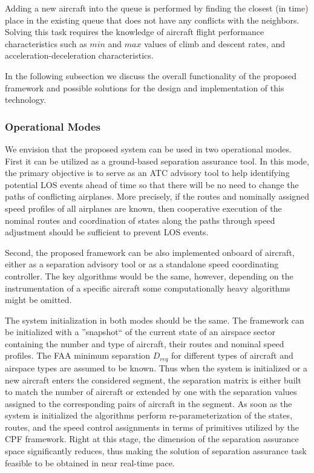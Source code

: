 \documentclass[letter,onecolumn,12pt]{aiaa-tc}
\newcommand{\1}{1_n}
\begin{document}
\begin{itemize}
Adding a new aircraft into the queue is performed by finding the closest (in time) place in the existing queue that does not have any conflicts with the neighbors. Solving this task requires the knowledge of aircraft flight performance characteristics such as $min$ and $max$ values of climb and descent rates, and acceleration-deceleration characteristics.

\end{itemize}

In the  following subsection we discuss the overall functionality of the proposed framework and possible solutions for the design and implementation of this technology.

\subsubsection{Operational Modes}

We envision that the proposed system can be used in two operational modes. First it can be utilized as a ground-based separation assurance tool. In this mode, the primary objective is to serve as an ATC advisory tool to help identifying potential LOS events ahead of time so that there will be no need to change the paths of conflicting airplanes. More precisely, if the routes and nominally assigned speed profiles of all airplanes are known, then cooperative execution of the nominal routes and coordination of states along the paths through speed adjustment should be sufficient to prevent LOS events.

Second, the proposed framework can be also implemented onboard of aircraft, either as a separation advisory tool or as a standalone speed coordinating controller. The key algorithms would be the same, however, depending on the instrumentation of a specific aircraft some computationally heavy algorithms might be omitted.

The system initialization in both modes should be the same. The framework can be initialized with a ''snapshot`` of the current state of an airspace sector containing the number and type of aircraft, their routes and nominal speed profiles. The FAA minimum separation $D_{req}$ for different types of aircraft and airspace types are assumed to be known. Thus when the system is initialized or a new aircraft enters the considered segment, the separation matrix is either built to match the number of aircraft or extended by one with the  separation values assigned to the corresponding pairs of aircraft in the segment. As soon as the system is initialized the algorithms perform re-parameterization of the states, routes, and the speed control assignments in terms of primitives utilized by the CPF framework. Right at this stage, the dimension of the separation assurance space significantly reduces, thus making the solution of separation assurance task feasible to be obtained in near real-time pace.
\end{document}
